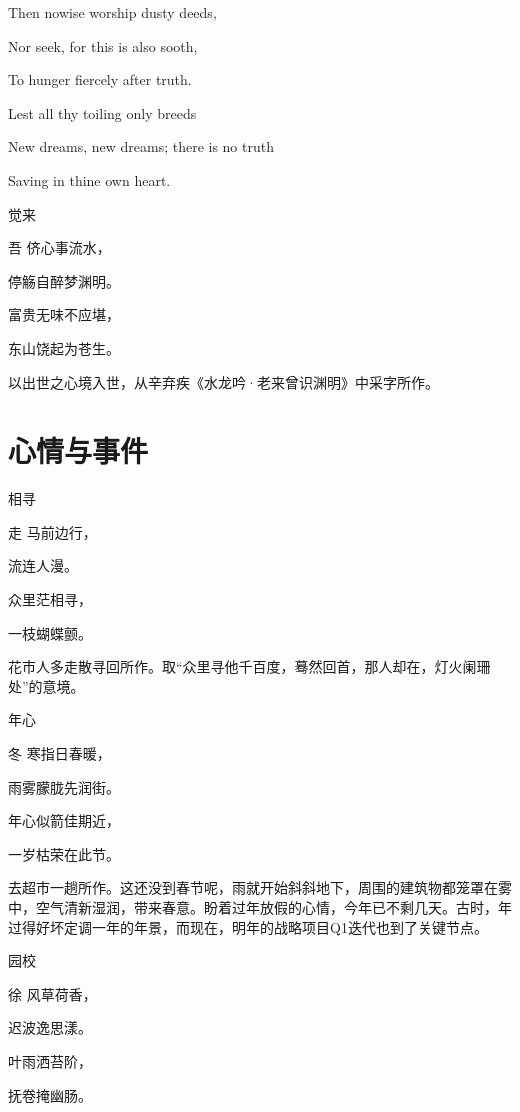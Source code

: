 \documentclass{article}
\newenvironment{poem}[3]{
\begin{minipage}{\textwidth}
\begin{pinyinscope}\begin{center}\Large\linespread{1.4}\selectfont #2\end{center}\end{pinyinscope}
\begin{pinyinscope}
	\begin{center}
	\Large\linespread{1.4}\rmfamily\selectfont #3
}{\end{center}
\end{pinyinscope}
\end{minipage}
}
\begin{document}
\begin{displayquote}
Then nowise worship dusty deeds,

Nor seek, for this is also sooth,

To hunger fiercely after truth.

Lest all thy toiling only breeds

New dreams, new dreams; there is no truth

Saving in thine own heart.
\end{displayquote}

\begin{poem}{}{觉来}
吾侪心事{}流水，

停觞自醉梦渊明。

富贵无味不应堪，

东山饶起为苍生。
\end{poem}

以出世之心境入世，从辛弃疾《水龙吟·老来曾识渊明》中采字所作。

\section{心情与事件}

\begin{poem}{}{相寻}
走马前边行，

流连人{}漫。

众里茫相寻，

一枝蝴蝶颤。
\end{poem}

花市人多走散寻回所作。取“众里寻他千百度，蓦然回首，那人却在，灯火阑珊处”的意境。

\begin{poem}{}{年心}
冬寒指日{}春暖，

雨雾朦胧先润街。

年心似箭佳期近，

一岁枯荣在此节。
\end{poem}

去超市一趟所作。这还没到春节呢，雨就开始斜斜地下，周围的建筑物都笼罩在雾中，空气清新湿润，带来春意。盼着过年放假的心情，今年已不剩几天。古时，年过得好坏定调一年的年景，而现在，明年的战略项目Q1迭代也到了关键节点。

\begin{poem}{}{园校}
徐风草荷香，

迟波逸思漾。

叶雨洒苔阶，

抚卷掩幽肠。
\end{poem}
\end{document}
